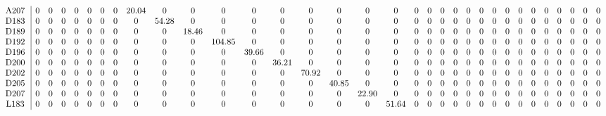 \begin{table}[H]
\begin{center}
\begin{math}
\begin{array}{c|cccccccccccccccccccccccccccccccc}
\mathrm{A207} \hspace*{2pt} &  0 &  0 &  0 &  0 &  0 &  0 &  0 &      20.04 &  0 &  0 &  0 &  0 &  0 &  0 &  0 &  0 &  0 &  0 &  0 &  0 &  0 &  0 &  0 &  0 &  0 &  0 &  0 &  0 &  0 &  0 &  0 &  0 \\
\mathrm{D183} \hspace*{2pt} &  0 &  0 &  0 &  0 &  0 &  0 &  0 &  0 &      54.28 &  0 &  0 &  0 &  0 &  0 &  0 &  0 &  0 &  0 &  0 &  0 &  0 &  0 &  0 &  0 &  0 &  0 &  0 &  0 &  0 &  0 &  0 &  0 \\
\mathrm{D189} \hspace*{2pt} &  0 &  0 &  0 &  0 &  0 &  0 &  0 &  0 &  0 &      18.46 &  0 &  0 &  0 &  0 &  0 &  0 &  0 &  0 &  0 &  0 &  0 &  0 &  0 &  0 &  0 &  0 &  0 &  0 &  0 &  0 &  0 &  0 \\
\mathrm{D192} \hspace*{2pt} &  0 &  0 &  0 &  0 &  0 &  0 &  0 &  0 &  0 &  0 &     104.85 &  0 &  0 &  0 &  0 &  0 &  0 &  0 &  0 &  0 &  0 &  0 &  0 &  0 &  0 &  0 &  0 &  0 &  0 &  0 &  0 &  0 \\
\mathrm{D196} \hspace*{2pt} &  0 &  0 &  0 &  0 &  0 &  0 &  0 &  0 &  0 &  0 &  0 &      39.66 &  0 &  0 &  0 &  0 &  0 &  0 &  0 &  0 &  0 &  0 &  0 &  0 &  0 &  0 &  0 &  0 &  0 &  0 &  0 &  0 \\
\mathrm{D200} \hspace*{2pt} &  0 &  0 &  0 &  0 &  0 &  0 &  0 &  0 &  0 &  0 &  0 &  0 &      36.21 &  0 &  0 &  0 &  0 &  0 &  0 &  0 &  0 &  0 &  0 &  0 &  0 &  0 &  0 &  0 &  0 &  0 &  0 &  0 \\
\mathrm{D202} \hspace*{2pt} &  0 &  0 &  0 &  0 &  0 &  0 &  0 &  0 &  0 &  0 &  0 &  0 &  0 &      70.92 &  0 &  0 &  0 &  0 &  0 &  0 &  0 &  0 &  0 &  0 &  0 &  0 &  0 &  0 &  0 &  0 &  0 &  0 \\
\mathrm{D205} \hspace*{2pt} &  0 &  0 &  0 &  0 &  0 &  0 &  0 &  0 &  0 &  0 &  0 &  0 &  0 &  0 &      40.85 &  0 &  0 &  0 &  0 &  0 &  0 &  0 &  0 &  0 &  0 &  0 &  0 &  0 &  0 &  0 &  0 &  0 \\
\mathrm{D207} \hspace*{2pt} &  0 &  0 &  0 &  0 &  0 &  0 &  0 &  0 &  0 &  0 &  0 &  0 &  0 &  0 &  0 &      22.90 &  0 &  0 &  0 &  0 &  0 &  0 &  0 &  0 &  0 &  0 &  0 &  0 &  0 &  0 &  0 &  0 \\
\mathrm{L183} \hspace*{2pt} &  0 &  0 &  0 &  0 &  0 &  0 &  0 &  0 &  0 &  0 &  0 &  0 &  0 &  0 &  0 &  0 &      51.64 &  0 &  0 &  0 &  0 &  0 &  0 &  0 &  0 &  0 &  0 &  0 &  0 &  0 &  0 &  0 \\

\end{array}
\end{math}
\end{center}
\end{table}
